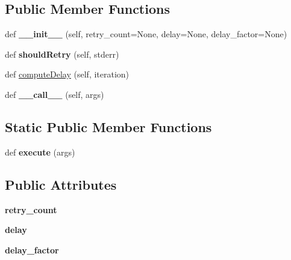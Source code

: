 \subsection*{Public Member Functions}
\begin{DoxyCompactItemize}
\item 
\mbox{\label{classgit__retry_1_1GitRetry_afd10887d2f8be34db5ce66284b82ac03}} 
def {\bfseries \+\_\+\+\_\+init\+\_\+\+\_\+} (self, retry\+\_\+count=None, delay=None, delay\+\_\+factor=None)
\item 
\mbox{\label{classgit__retry_1_1GitRetry_a36a0ed61b5d6774b1ae3c42ce25f980b}} 
def {\bfseries should\+Retry} (self, stderr)
\item 
def \hyperlink{classgit__retry_1_1GitRetry_a02c4f3a76f8056d3fb5641096edeab9f}{compute\+Delay} (self, iteration)
\item 
\mbox{\label{classgit__retry_1_1GitRetry_a9abb3e89c67856b610ced67a8c5b24cd}} 
def {\bfseries \+\_\+\+\_\+call\+\_\+\+\_\+} (self, args)
\end{DoxyCompactItemize}
\subsection*{Static Public Member Functions}
\begin{DoxyCompactItemize}
\item 
\mbox{\label{classgit__retry_1_1GitRetry_a58d589e25237723c9f2732d97971e363}} 
def {\bfseries execute} (args)
\end{DoxyCompactItemize}
\subsection*{Public Attributes}
\begin{DoxyCompactItemize}
\item 
\mbox{\label{classgit__retry_1_1GitRetry_a4929f3297f14422c54e7dc3eb903a368}} 
{\bfseries retry\+\_\+count}
\item 
\mbox{\label{classgit__retry_1_1GitRetry_a4c5eef27173fe8d6b4d9624ab00350c4}} 
{\bfseries delay}
\item 
\mbox{\label{classgit__retry_1_1GitRetry_a3b0bdcb58716068c498136246e1f0845}} 
{\bfseries delay\+\_\+factor}
\end{DoxyCompactItemize}
